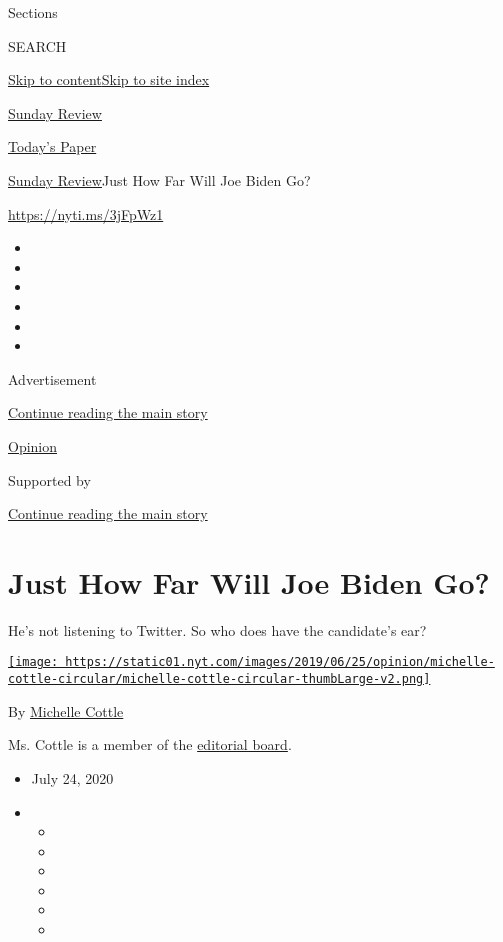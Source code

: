 Sections

SEARCH

\protect\hyperlink{site-content}{Skip to
content}\protect\hyperlink{site-index}{Skip to site index}

\href{https://www.nytimes.com/section/opinion/sunday}{Sunday Review}

\href{https://myaccount.nytimes.com/auth/login?response_type=cookie\&client_id=vi}{}

\href{https://www.nytimes.com/section/todayspaper}{Today's Paper}

\href{/section/opinion/sunday}{Sunday Review}\textbar{}Just How Far Will
Joe Biden Go?

\url{https://nyti.ms/3jFpWz1}

\begin{itemize}
\item
\item
\item
\item
\item
\item
\end{itemize}

Advertisement

\protect\hyperlink{after-top}{Continue reading the main story}

\href{/section/opinion}{Opinion}

Supported by

\protect\hyperlink{after-sponsor}{Continue reading the main story}

\hypertarget{just-how-far-will-joe-biden-go}{%
\section{Just How Far Will Joe Biden
Go?}\label{just-how-far-will-joe-biden-go}}

He's not listening to Twitter. So who does have the candidate's ear?

\href{https://www.nytimes.com/by/michelle-cottle}{\texttt{[image: https://static01.nyt.com/images/2019/06/25/opinion/michelle-cottle-circular/michelle-cottle-circular-thumbLarge-v2.png]}}

By \href{https://www.nytimes.com/by/michelle-cottle}{Michelle Cottle}

Ms. Cottle is a member of the
\href{https://www.nytimes.com/interactive/2018/opinion/editorialboard.html}{editorial
board}.

\begin{itemize}
\item
  July 24, 2020
\item
  \begin{itemize}
  \item
  \item
  \item
  \item
  \item
  \item
  \end{itemize}
\end{itemize}

